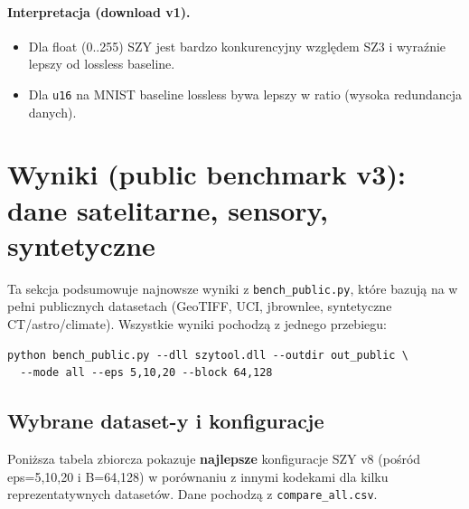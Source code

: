\documentclass[11pt,a4paper]{article}
\begin{document}
\paragraph{Interpretacja (download v1).}
\begin{itemize}
  \item Dla float (0..255) SZY jest bardzo konkurencyjny względem SZ3 i wyraźnie lepszy od lossless baseline.
  \item Dla \texttt{u16} na MNIST baseline lossless bywa lepszy w ratio (wysoka redundancja danych).
\end{itemize}

\section{Wyniki (public benchmark v3): dane satelitarne, sensory, syntetyczne}
\label{sec:public_bench_results}

Ta sekcja podsumowuje najnowsze wyniki z \texttt{bench\_public.py}, które bazują na w pełni publicznych datasetach (GeoTIFF, UCI, jbrownlee, syntetyczne CT/astro/climate). Wszystkie wyniki pochodzą z jednego przebiegu:

\begin{lstlisting}[style=txtstyle]
python bench_public.py --dll szytool.dll --outdir out_public \
  --mode all --eps 5,10,20 --block 64,128
\end{lstlisting}

\subsection{Wybrane dataset-y i konfiguracje}
Poniższa tabela zbiorcza pokazuje \textbf{najlepsze} konfiguracje SZY v8 (pośród eps=5,10,20 i B=64,128) w porównaniu z innymi kodekami dla kilku reprezentatywnych datasetów. Dane pochodzą z \texttt{compare\_all.csv}.
\end{document}
